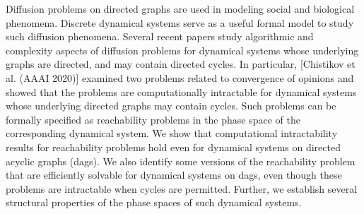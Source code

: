 Diffusion problems on directed graphs are used in modeling social
and biological phenomena. Discrete dynamical systems serve as a
useful formal model to study such diffusion phenomena. Several
recent papers study algorithmic and complexity aspects of
diffusion problems for dynamical systems whose underlying graphs
are directed, and may contain directed cycles.  In particular,
[Chistikov et al. (AAAI 2020)] examined two problems related to
convergence of opinions and showed that the problems are computationally
intractable for dynamical systems whose underlying directed graphs
may contain cycles. Such problems can be formally specified as
reachability problems in the phase space of the corresponding
dynamical system. We show that computational intractability
results for reachability problems hold even for dynamical systems
on directed acyclic graphs (dags). We also identify some versions
of the reachability problem that are efficiently solvable for
dynamical systems on dags, even though these problems are intractable
when cycles are permitted.  Further, we establish several structural
properties of the phase spaces of such dynamical systems.
